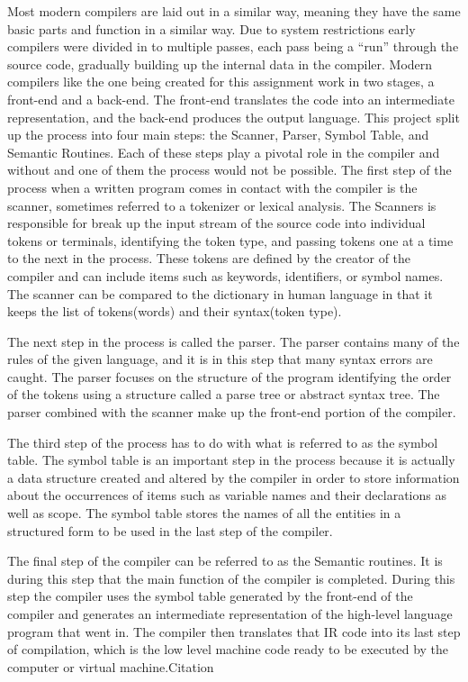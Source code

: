 \documentclass[12pt, oneside]{article}   	%
\begin{document}
Most modern compilers are laid out in a similar way, meaning they have
the same basic parts and function in a similar way. Due to system restrictions
early compilers were divided in to multiple passes, each pass being a “run”
through the source code, gradually building up the internal data in the compiler.
Modern compilers like the one being created for this assignment work in two
stages, a front-end and a back-end. The front-end translates the code into an
intermediate representation, and the back-end produces the output language.
This project split up the process into four main steps: the Scanner, Parser,
Symbol Table, and Semantic Routines. Each of these steps play a pivotal role in
the compiler and without and one of them the process would not be possible. The
first step of the process when a written program comes in contact with the
compiler is the scanner, sometimes referred to a tokenizer or lexical analysis.
The Scanners is responsible for break up the input stream of the source code
into individual tokens or terminals, identifying the token type, and passing tokens
one at a time to the next in the process. These tokens are defined by the creator
of the compiler and can include items such as keywords, identifiers, or symbol
names. The scanner can be compared to the dictionary in human language in that it keeps the list of tokens(words) and their syntax(token type).

The next step in the process is called the parser. The parser contains
many of the rules of the given language, and it is in this step that many syntax
errors are caught. The parser focuses on the structure of the program identifying
the order of the tokens using a structure called a parse tree or abstract syntax
tree. The parser combined with the scanner make up the front-end portion of the
compiler.

 The third step of the process has to do with what is referred to as the
symbol table. The symbol table is an important step in the process because it is
actually a data structure created and altered by the compiler in order to store
information about the occurrences of items such as variable names and their
declarations as well as scope. The symbol table stores the names of all the
entities in a structured form to be used in the last step of the compiler.

The final step of the compiler can be referred to as the Semantic
routines. It is during this step that the main function of the compiler is completed.
During this step the compiler uses the symbol table generated by the front-end of
the compiler and generates an intermediate representation of the high-level
language program that went in. The compiler then translates that IR code into its
last step of compilation, which is the low level machine code ready to be
executed by the computer or virtual machine.Citation
\end{document}
